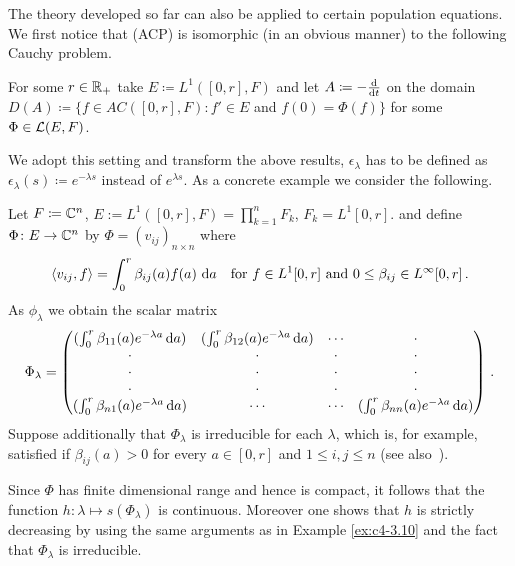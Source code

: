 The theory developed so far can also be applied to certain population equations.
We first notice that (ACP) is isomorphic (in an obvious manner) to the following Cauchy problem.

For some $r \in \mathbb{R}_{+}$ take $E \coloneqq L^{1}([0,r], F)$ and let $A \coloneqq - \frac{\mathop{}\!\mathrm{d}{}}{\mathop{}\!\mathrm{d}{t}}$ on the domain $D(A) \coloneqq \{f \in AC([0,r], F) \colon f' \in E$ and $f(0) = \Phi(f)\}$ for some $\Phi \in \mathcal{L}(E,F)$.

We adopt this setting and transform the above results, \eg $\epsilon_{\lambda}$ has to be defined as $\epsilon_{\lambda}(s) \coloneqq e^{-\lambda s}$ instead of $e^{\lambda s}$.
As a concrete example we consider the following.



\begin{example}\label{ex:c4-3.12}
%
%
%
Let $F \coloneqq \mathbb{C}^{n}$, $E:= L^{1}([0,r],F) = \prod_{k=1}^{n} F_{k}$, $F_{k} = L^{1}[0,r]$. and define $\Phi \colon E \to \mathbb{C}^{n}$ by $\Phi = (v_{ij})_{{n\times n}}$ where
\[
\langle v_{ij}, f \rangle = \int_{0}^{r} \beta_{ij}(a)f(a) \, \mathop{}\!\mathrm{d}{a} \quad \text{for } f \in L^{1}[0,r] \text{ and } 0 \leq \beta_{ij} \in L^{\infty}[0,r] \,.
\]
As $\phi_{\lambda}$ we obtain the scalar matrix
\begin{equation*}\label{eq:c4-3.12-kgk2}
\Phi_{\lambda} = \begin{pmatrix}
(\int_0^r \beta_{11}(a)e^{-\lambda a}\mathop{}\!\mathrm{d}{a}) & (\int_0^r \beta_{12}(a)e^{-\lambda a}\mathop{}\!\mathrm{d}{a}) & \cdots & \cdot \\
\cdot & \cdot & \cdot & \cdot \\
\cdot & \cdot & \cdot & \cdot \\
\cdot & \cdot & \cdot & \cdot \\
(\int_0^r \beta_{n1}(a)e^{-\lambda a}\mathop{}\!\mathrm{d}{a}) & \cdots & \cdots & (\int_0^r \beta_{nn}(a)e^{-\lambda a}\mathop{}\!\mathrm{d}{a})
\end{pmatrix}\,. 
\end{equation*}
Suppose additionally that $\Phi_{\lambda}$ is irreducible for each $\lambda$, which is, for example, satisfied if $\beta_{ij}(a) > 0$ for every $a \in [0,r]$ and $1 \leq i,j \leq n$ (see also \citet[p.257ff]{bellmancooke:1963}\,).

Since $\Phi$ has finite dimensional range and hence is compact, it follows that the function $h \colon \lambda \mapsto s(\Phi_{\lambda})$ is continuous.
Moreover one shows that $h$ is strictly decreasing by using the same arguments as in Example \ref{ex:c4-3.10} and the fact that $\Phi_{\lambda}$ is irreducible.


\end{example}
